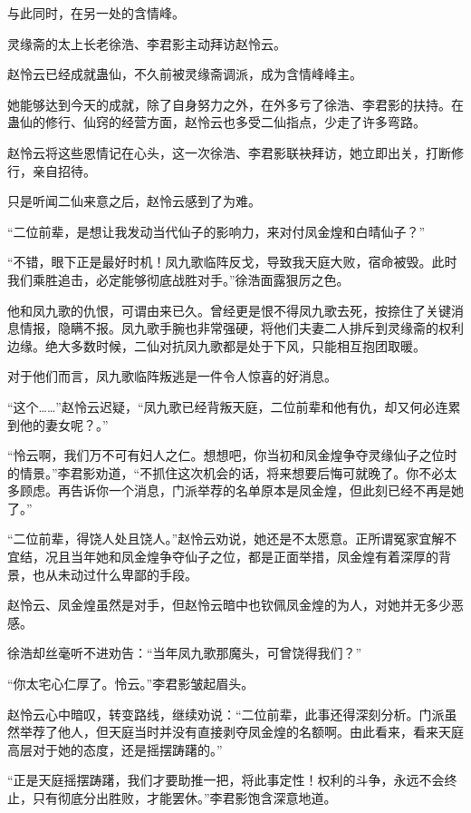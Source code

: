 \begin{this_body}
与此同时，在另一处的含情峰。

灵缘斋的太上长老徐浩、李君影主动拜访赵怜云。

赵怜云已经成就蛊仙，不久前被灵缘斋调派，成为含情峰峰主。

她能够达到今天的成就，除了自身努力之外，在外多亏了徐浩、李君影的扶持。在蛊仙的修行、仙窍的经营方面，赵怜云也多受二仙指点，少走了许多弯路。

赵怜云将这些恩情记在心头，这一次徐浩、李君影联袂拜访，她立即出关，打断修行，亲自招待。

只是听闻二仙来意之后，赵怜云感到了为难。

“二位前辈，是想让我发动当代仙子的影响力，来对付凤金煌和白晴仙子？”

“不错，眼下正是最好时机！凤九歌临阵反戈，导致我天庭大败，宿命被毁。此时我们乘胜追击，必定能够彻底战胜对手。”徐浩面露狠厉之色。

他和凤九歌的仇恨，可谓由来已久。曾经更是恨不得凤九歌去死，按捺住了关键消息情报，隐瞒不报。凤九歌手腕也非常强硬，将他们夫妻二人排斥到灵缘斋的权利边缘。绝大多数时候，二仙对抗凤九歌都是处于下风，只能相互抱团取暖。

对于他们而言，凤九歌临阵叛逃是一件令人惊喜的好消息。

“这个……”赵怜云迟疑，“凤九歌已经背叛天庭，二位前辈和他有仇，却又何必连累到他的妻女呢？。”

“怜云啊，我们万不可有妇人之仁。想想吧，你当初和凤金煌争夺灵缘仙子之位时的情景。”李君影劝道，“不抓住这次机会的话，将来想要后悔可就晚了。你不必太多顾虑。再告诉你一个消息，门派举荐的名单原本是凤金煌，但此刻已经不再是她了。”

“二位前辈，得饶人处且饶人。”赵怜云劝说，她还是不太愿意。正所谓冤家宜解不宜结，况且当年她和凤金煌争夺仙子之位，都是正面举措，凤金煌有着深厚的背景，也从未动过什么卑鄙的手段。

赵怜云、凤金煌虽然是对手，但赵怜云暗中也钦佩凤金煌的为人，对她并无多少恶感。

徐浩却丝毫听不进劝告：“当年凤九歌那魔头，可曾饶得我们？”

“你太宅心仁厚了。怜云。”李君影皱起眉头。

赵怜云心中暗叹，转变路线，继续劝说：“二位前辈，此事还得深刻分析。门派虽然举荐了他人，但天庭当时并没有直接剥夺凤金煌的名额啊。由此看来，看来天庭高层对于她的态度，还是摇摆踌躇的。”

“正是天庭摇摆踌躇，我们才要助推一把，将此事定性！权利的斗争，永远不会终止，只有彻底分出胜败，才能罢休。”李君影饱含深意地道。


\end{this_body}
